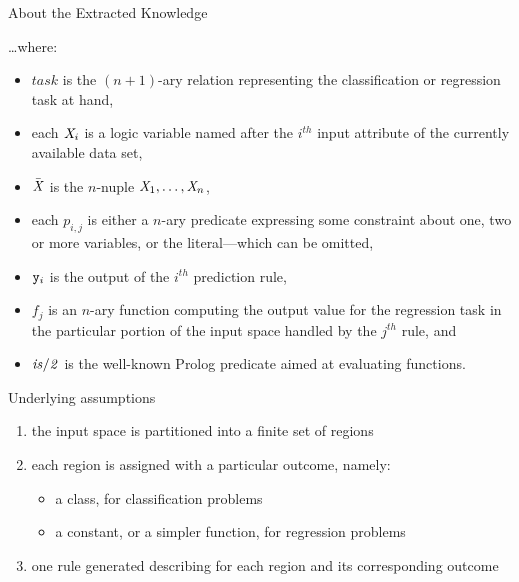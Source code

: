 \documentclass[presentation]{beamer}\mode<presentation>{\usetheme{AMSBolognaFC}}
\begin{document}
\begin{frame}[allowframebreaks]{About the Extracted Knowledge}
    \framebreak

    \ldots where:
    \begin{itemize}
        \item $\mathit{task}$ is the $(n+1)$-ary relation representing the classification or regression task at hand,
        \medskip
        \item each $\mathit{X}_i$ is a logic variable named after the $i^\mathit{th}$ input attribute of the currently available data set,
        \medskip
        \item $\bar{\mathit{X}}$ is the $n$-nuple $\mathit{X}_1, \ldots, \mathit{X}_n$,
        \medskip
        \item each $p_{i,j}$ is either a $n$-ary predicate expressing some constraint about one, two or more variables, or the  literal---which can be omitted,
        \medskip
        \item $\mathtt{y}_i$ is the output of the $i^{th}$ prediction rule,
        \medskip
        \item $f_j$ is an $n$-ary function computing the output value for the regression task in the particular portion of the input space handled by the $j^\mathit{th}$ rule, and
        \medskip
        \item $\mathit{is/2}$ is the well-known Prolog predicate aimed at evaluating functions.
    \end{itemize}

    \framebreak

    \begin{block}{Underlying assumptions}
        \begin{enumerate}
            \item the input space is \alert{partitioned} into a finite set of regions

            \item each region is \alert{assigned} with a particular outcome, namely:
            \begin{itemize}
                \item a \alert{class}, for \alert{classification} problems
                \item a \alert{constant}, or a simpler function, for \alert{regression} problems
            \end{itemize}

            \item \alert{one rule} generated describing \alert{for each region} and its corresponding outcome
        \end{enumerate}
    \end{block}
\end{frame}
\end{document}
